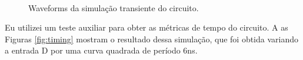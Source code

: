 \documentclass{iiufrgs}
\begin{document}
\begin{figure}[htbp]
    \centering
    \caption{Waveforms da simulação transiente do circuito.}
     \\
    \label{fig:wave}
\end{figure}

\FloatBarrier

Eu utilizei um teste auxiliar para obter as métricas de tempo do circuito. A as Figuras \ref{fig:timing} mostram o resultado dessa simulação, que foi obtida variando a entrada D por uma curva quadrada de período 6ns.
\end{document}

